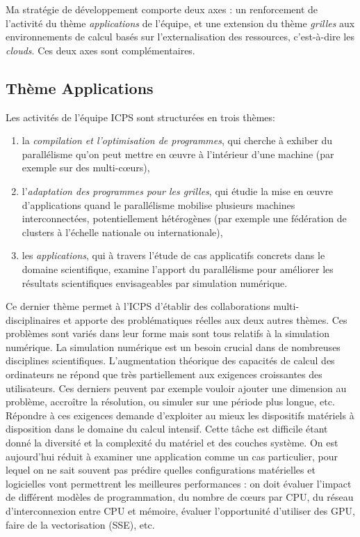 \documentclass[11pt]{article}
\begin{document}
Ma stratégie de développement comporte deux axes : un renforcement de 
l'activité du thème \textit{applications} de l'équipe, et une extension
du thème \textit{grilles} aux environnements de calcul basés sur 
l'externalisation des ressources, c'est-à-dire les \emph{clouds}. Ces deux
axes sont complémentaires.


\subsection*{Thème Applications}
Les activités de l'équipe ICPS sont structurées en trois thèmes: 
\begin{enumerate}
\item la \textit{compilation et l'optimisation de programmes}, qui 
cherche à exhiber du parallélisme qu'on peut mettre en {\oe}uvre à 
l'intérieur d'une machine (par exemple sur des multi-c{\oe}urs),
\item l'\textit{adaptation des programmes pour les grilles}, qui 
étudie la mise en {\oe}uvre d'applications quand le parallélisme mobilise 
plusieurs machines interconnectées, potentiellement hétérogènes (par 
exemple une fédération de clusters à l'échelle nationale ou internationale), 
\item les \textit{applications}, qui à travers l'étude de cas 
applicatifs concrets dans le domaine scientifique, examine 
l'apport du parallélisme pour améliorer les résultats scientifiques
envisageables par simulation  numérique.
\end{enumerate}

Ce dernier thème permet à l'ICPS d'établir des collaborations multi-%
disciplinaires et apporte des problématiques réelles aux deux autres 
thèmes. Ces problèmes sont variés dans leur forme mais sont tous
relatifs à la simulation numérique.
La simulation numérique est un besoin crucial dans de nombreuses 
disciplines scientifiques. L'augmentation théorique des capacités
de calcul des ordinateurs ne répond que très partiellement aux
exigences croissantes des utilisateurs. Ces derniers peuvent par
exemple vouloir ajouter une dimension au problème, accroître la 
résolution, ou simuler sur une période plus longue, etc. Répondre 
à ces exigences demande d'exploiter au mieux les dispositifs 
matériels à disposition dans le domaine du calcul intensif.
Cette tâche est difficile étant donné la diversité et la complexité
du matériel et des couches système. On est aujourd'hui réduit à examiner 
une application comme un cas particulier, pour lequel on ne sait souvent
pas prédire quelles configurations matérielles et logicielles vont 
permettrent les meilleures performances : on doit évaluer l'impact de
différent modèles de programmation, du nombre de c{\oe}urs par CPU,
du réseau d'interconnexion entre CPU et mémoire, évaluer l'opportunité
d'utiliser des GPU, faire de la vectorisation (SSE), etc.\\
\end{document}
